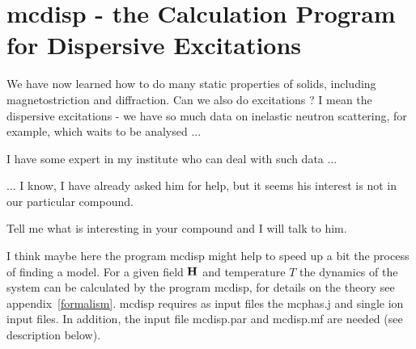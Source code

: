 
\section{{\prg mcdisp} - the Calculation Program for Dispersive Excitations}\label{mcdisp}

\OO We have now learned how to do many static properties of solids, including
 magnetostriction and diffraction. Can we also do excitations ? I mean the dispersive
excitations - we have so much data on inelastic neutron scattering, for example, which waits
to be analysed ...

\PP I have some expert in my institute who can deal with such data ...

\OO ... I know, I have already asked him for help, but it seems his interest is not
in our particular compound. 

\PP Tell me what is interesting in your compound and I will talk to him.

\EE I think maybe here the program {\prg mcdisp} might help to speed up a bit the process of finding
a model.
For a given field $\mathbf H$ and temperature $T$ the dynamics of the  system
can be calculated by the program {\prg mcdisp}, 
for details
on the theory see appendix~\ref{formalism}. 
{\prg mcdisp} requires as input files
the {\prg mcphas.j} and single ion input files. In addition, the input file
{\prg mcdisp.par} and {\prg mcdisp.mf} are needed 
(see description below). 


